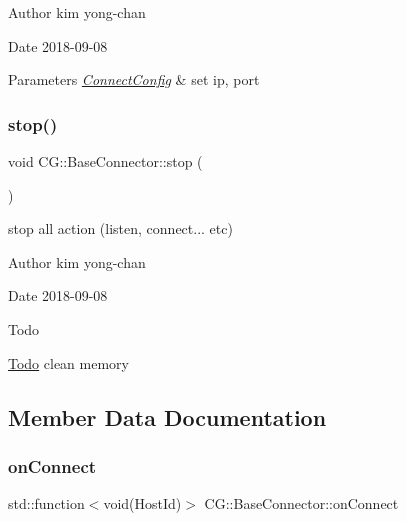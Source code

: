 \begin{DoxyAuthor}{Author}
kim yong-\/chan 
\end{DoxyAuthor}
\begin{DoxyDate}{Date}
2018-\/09-\/08 
\end{DoxyDate}

\begin{DoxyParams}{Parameters}
{\em \mbox{\hyperlink{class_c_g_1_1_connect_config}{Connect\+Config}}} & set ip, port \\
\hline
\end{DoxyParams}
\mbox{\label{class_c_g_1_1_base_connector_abd3e4f816a311c41418d5e090de2de15}} 
\subsubsection{\texorpdfstring{stop()}{stop()}}
{\footnotesize\ttfamily void C\+G\+::\+Base\+Connector\+::stop (\begin{DoxyParamCaption}{ }\end{DoxyParamCaption})}



stop all action (listen, connect... etc) 

\begin{DoxyAuthor}{Author}
kim yong-\/chan 
\end{DoxyAuthor}
\begin{DoxyDate}{Date}
2018-\/09-\/08 
\end{DoxyDate}
\begin{DoxyRefDesc}{Todo}
\item[\mbox{\hyperlink{todo__todo000003}{Todo}}]clean memory \end{DoxyRefDesc}


\subsection{Member Data Documentation}
\mbox{\label{class_c_g_1_1_base_connector_a458c5e8376f9961d03a37624ad8f3ed6}} 
\subsubsection{\texorpdfstring{on\+Connect}{onConnect}}
{\footnotesize\ttfamily std\+::function$<$void(Host\+Id)$>$ C\+G\+::\+Base\+Connector\+::on\+Connect}



